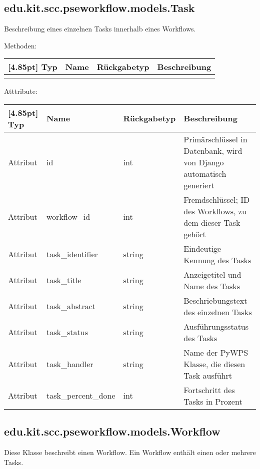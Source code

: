 		\subsection{edu.kit.scc.pseworkflow.models.Task}
			Beschreibung eines einzelnen Tasks innerhalb eines Workflows.
			
			Methoden:
			\begin{center}
				\setlength\tabcolsep{5pt}
				\renewcommand{\arraystretch}{1.5}
				
				\begin{tabularx}{\textwidth}{|l|l|l|X|}
					\hline
					\rowcolor[gray]{0.75}[4.85pt]
					Typ & Name & Rückgabetyp & Beschreibung \\ \hline 
					&&& \\
					\hline
				\end{tabularx}
			\end{center}
			
			Atttribute:
			\begin{center}
				\setlength\tabcolsep{5pt}
				\renewcommand{\arraystretch}{1.5}
				
				\begin{tabularx}{\textwidth}{|l|l|l|X|}
					\hline
					\rowcolor[gray]{0.75}[4.85pt]
					Typ & Name & Rückgabetyp & Beschreibung \\ \hline 
					Attribut & id & int & Primärschlüssel in Datenbank, wird von Django automatisch generiert \\ \hline
					Attribut & workflow\_id & int & Fremdschlüssel; ID des Workflows, zu dem dieser Task gehört \\ \hline
					Attribut & task\_identifier & string & Eindeutige Kennung des Tasks \\ \hline
					Attribut & task\_title & string & Anzeigetitel und Name des Tasks \\ \hline
					Attribut & task\_abstract & string & Beschriebungstext des einzelnen Tasks \\ \hline
					Attribut & task\_status & string & Ausführungsstatus des Tasks \\ \hline
					Attribut & task\_handler & string & Name der PyWPS Klasse, die diesen Task ausführt \\ \hline
					Attribut & task\_percent\_done & int & Fortschritt des Tasks in Prozent \\
					\hline
				\end{tabularx}
			\end{center}
 
        \subsection{edu.kit.scc.pseworkflow.models.Workflow}
	        Diese Klasse beschreibt einen Workflow. Ein Workflow enthält einen oder mehrere Tasks.
	        
